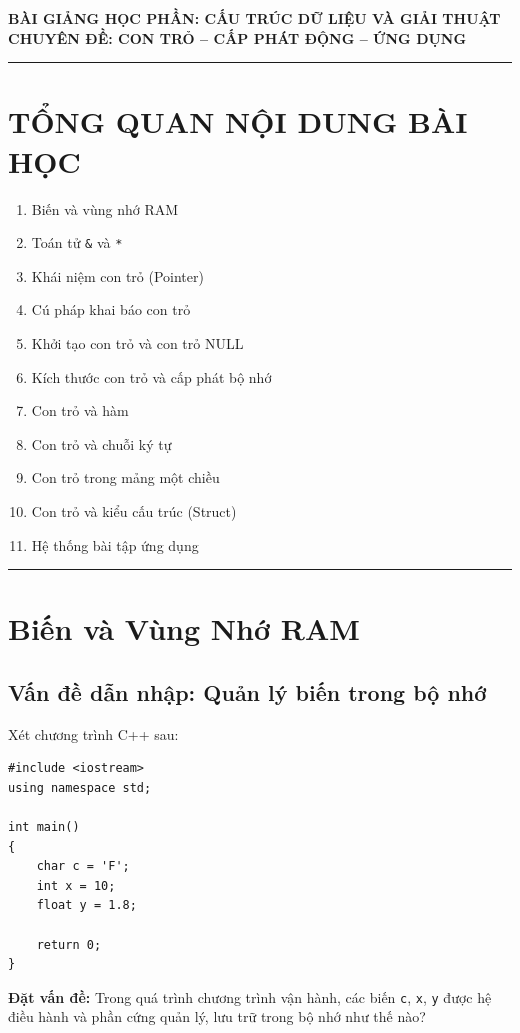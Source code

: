 \documentclass[12pt,a4paper]{article}
\begin{document}
\begin{center}
    {\large \textbf{BÀI GIẢNG HỌC PHẦN: CẤU TRÚC DỮ LIỆU VÀ GIẢI THUẬT}}\\[0.25em]
    {\LARGE \textbf{\color{codeblue}CHUYÊN ĐỀ: CON TRỎ -- CẤP PHÁT ĐỘNG -- ỨNG DỤNG}}\\[0.35em]
    \rule{\textwidth}{1pt}
\end{center}

\vspace{-0.6em}

\section*{TỔNG QUAN NỘI DUNG BÀI HỌC}
\begin{enumerate}[leftmargin=2.5em, itemsep=0.05em]
    \item Biến và vùng nhớ RAM
    \item Toán tử \texttt{\&} và \texttt{*}
    \item Khái niệm con trỏ (Pointer)
    \item Cú pháp khai báo con trỏ
    \item Khởi tạo con trỏ và con trỏ NULL
    \item Kích thước con trỏ và cấp phát bộ nhớ
    \item Con trỏ và hàm
    \item Con trỏ và chuỗi ký tự
    \item Con trỏ trong mảng một chiều
    \item Con trỏ và kiểu cấu trúc (Struct)
    \item Hệ thống bài tập ứng dụng
\end{enumerate}

\vspace{0.4em}
\hrule
\vspace{0.8em}

\section{Biến và Vùng Nhớ RAM}

\subsection{Vấn đề dẫn nhập: Quản lý biến trong bộ nhớ}
Xét chương trình C++ sau:
\begin{lstlisting}
#include <iostream>
using namespace std;

int main()
{
    char c = 'F';
    int x = 10;
    float y = 1.8;

    return 0;
}
\end{lstlisting}
\textbf{Đặt vấn đề:} Trong quá trình chương trình vận hành, các biến \texttt{c}, \texttt{x}, \texttt{y} được hệ điều hành và phần cứng quản lý, lưu trữ trong bộ nhớ như thế nào?
\end{document}
